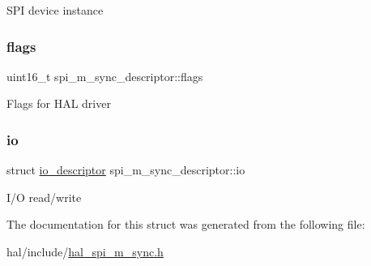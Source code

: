 S\+PI device instance \mbox{\label{structspi__m__sync__descriptor_a076a4812ce1f777bfdb71891333ed95c}} 
\subsubsection{\texorpdfstring{flags}{flags}}
{\footnotesize\ttfamily uint16\+\_\+t spi\+\_\+m\+\_\+sync\+\_\+descriptor\+::flags}

Flags for H\+AL driver \mbox{\label{structspi__m__sync__descriptor_a2a50cfeb0b6f494fb4ad77db7f44789d}} 
\subsubsection{\texorpdfstring{io}{io}}
{\footnotesize\ttfamily struct \hyperlink{structio__descriptor}{io\+\_\+descriptor} spi\+\_\+m\+\_\+sync\+\_\+descriptor\+::io}

I/O read/write 

The documentation for this struct was generated from the following file\+:\begin{DoxyCompactItemize}
\item 
hal/include/\hyperlink{hal__spi__m__sync_8h}{hal\+\_\+spi\+\_\+m\+\_\+sync.\+h}\end{DoxyCompactItemize}
